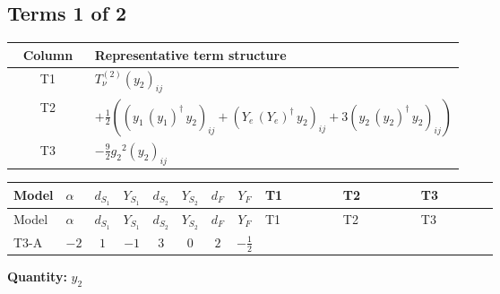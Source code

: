 \documentclass[8pt]{article}
\begin{document}
\begin{landscape}
\subsection*{Terms 1 of 2}
\begin{center}
\begin{tabular}{@{}c >{\raggedright\arraybackslash}p{0.82\linewidth}@{}}
\toprule
Column & Representative term structure \\
\midrule
T1 & \(\displaystyle T_{\nu}^{(2)} \left({y_2}\right)_{ij}\) \\
\midrule
T2 & \(\displaystyle +\frac{1}{2} (\left({y_1}\,\left({y_1}\right)^{\dagger}\,{y_2}\right)_{ij}+\left({Y_e}\,\left({Y_e}\right)^{\dagger}\,{y_2}\right)_{ij}+3 \left({y_2}\,\left({y_2}\right)^{\dagger}\,{y_2}\right)_{ij})\) \\
\midrule
T3 & \(\displaystyle -\frac{9}{2} {g_2}^2 \left({y_2}\right)_{ij}\) \\
\midrule
\bottomrule
\end{tabular}
\end{center}
\smallskip
\tiny
\begin{longtable}{@{}llcccccc >{\raggedright\arraybackslash}p{0.21\linewidth} >{\raggedright\arraybackslash}p{0.21\linewidth} >{\raggedright\arraybackslash}p{0.21\linewidth}@{}}
\toprule
Model & $\alpha$ & $d_{S_1}$ & $Y_{S_1}$ & $d_{S_2}$ & $Y_{S_2}$ & $d_F$ & $Y_F$ & T1 & T2 & T3 \\
\midrule
\endfirsthead
\toprule
Model & $\alpha$ & $d_{S_1}$ & $Y_{S_1}$ & $d_{S_2}$ & $Y_{S_2}$ & $d_F$ & $Y_F$ & T1 & T2 & T3 \\
\midrule
\endhead
T3-A & $-2$ & $1$ & $-1$ & $3$ & $0$ & $2$ & $-\frac{1}{2}$ & \scriptsize\adjustbox{max width=\linewidth}{$\begin{gathered} T_{\nu}^{(2)} \left({y_2}\right)_{ij}\end{gathered}$} & \scriptsize\adjustbox{max width=\linewidth}{$\begin{gathered} +\frac{1}{2} (\left({y_1}\,\left({y_1}\right)^{\dagger}\,{y_2}\right)_{ij}+\left({Y_e}\,\left({Y_e}\right)^{\dagger}\,{y_2}\right)_{ij}+3 \left({y_2}\,\left({y_2}\right)^{\dagger}\,{y_2}\right)_{ij})\end{gathered}$} & \scriptsize\adjustbox{max width=\linewidth}{$\begin{gathered} -\frac{9}{2} {g_2}^2 \left({y_2}\right)_{ij}\end{gathered}$} \\
\midrule
\bottomrule
\end{longtable}
\clearpage
\noindent\textbf{Quantity: }$y_2$\par\smallskip

\end{landscape}
\end{document}
